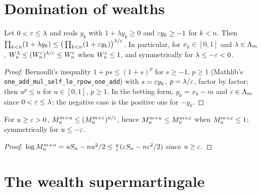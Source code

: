 \section{Domination of wealths}

\begin{lemma}
  \label{lem:fixedWealth_le_rpow}
  \leanok
  Let $0 < \varepsilon \le \lambda$ and reals $y_k$ with $1 + \lambda y_k \ge 0$ and $\varepsilon y_k \ge -1$ for
  $k < n$. Then $\prod_{k<n}(1 + \lambda y_k) \le \big(\prod_{k<n} (1 + \varepsilon y_k)\big)^{\lambda/\varepsilon}$.
  In particular, for $x_k \in [0, 1]$ and $\lambda \in \Lambda_m$, $W^\lambda_n \le (W^\varepsilon_n)^{\lambda/\varepsilon}
  \le W^\varepsilon_n$ when $W^\varepsilon_n \le 1$, and symmetrically for $\lambda \le -\varepsilon < 0$.
\end{lemma}

\begin{proof}
  \leanok
  Bernoulli's inequality $1 + p s \le (1+s)^p$ for $s \ge -1$, $p \ge 1$ (Mathlib's
  \texttt{one\_add\_mul\_self\_le\_rpow\_one\_add}) with $s = \varepsilon y_k$, $p = \lambda/\varepsilon$, factor
  by factor; then $u^p \le u$ for $u \in [0, 1]$, $p \ge 1$. In the betting form, $y_k = x_k - m$
  and $\varepsilon \in \Lambda_m$ since $0 < \varepsilon \le \lambda$; the negative case is the positive one for
  $-y_k$.
\end{proof}

\begin{lemma}
  \label{lem:subgTest_le_rpow}
  \leanok
  For $u \ge \varepsilon > 0$, $M^{m+u}_n \le (M^{m+\varepsilon}_n)^{u/\varepsilon}$, hence $M^{m+u}_n \le M^{m+\varepsilon}_n$
  when $M^{m+\varepsilon}_n \le 1$; symmetrically for $u \le -\varepsilon$.
\end{lemma}

\begin{proof}
  \leanok
  $\log M^{m+u}_n = u S_n - n u^2/2 \le \frac u{\varepsilon} (\varepsilon S_n - n\varepsilon^2/2)$ since $u \ge \varepsilon$.
\end{proof}

\section{The wealth supermartingale}

